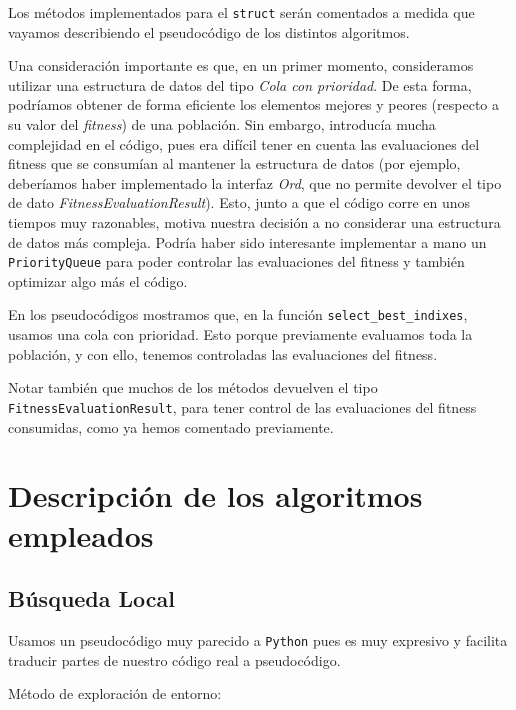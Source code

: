 \documentclass[11pt]{article}
\begin{document}
Los métodos implementados para el \lstinline{struct} serán comentados a medida que vayamos describiendo el pseudocódigo de los distintos algoritmos.

Una consideración importante es que, en un primer momento, consideramos utilizar una estructura de datos del tipo \emph{Cola con prioridad}. De esta forma, podríamos obtener de forma eficiente los elementos mejores y peores (respecto a su valor del \emph{fitness}) de una población. Sin embargo, introducía mucha complejidad en el código, pues era difícil tener en cuenta las evaluaciones del fitness que se consumían al mantener la estructura de datos (por ejemplo, deberíamos haber implementado la interfaz \emph{Ord}, que no permite devolver el tipo de dato \emph{FitnessEvaluationResult}). Esto, junto a que el código corre en unos tiempos muy razonables, motiva nuestra decisión a no considerar una estructura de datos más compleja. Podría haber sido interesante implementar a mano un \lstinline{PriorityQueue} para poder controlar las evaluaciones del fitness y también optimizar algo más el código.

En los pseudocódigos mostramos que, en la función \lstinline{select_best_indixes}, usamos una cola con prioridad. Esto porque previamente evaluamos toda la población, y con ello, tenemos controladas las evaluaciones del fitness.

Notar también que muchos de los métodos devuelven el tipo \lstinline{FitnessEvaluationResult}, para tener control de las evaluaciones del fitness consumidas, como ya hemos comentado previamente.

\pagebreak

\section{Descripción de los algoritmos empleados}

\subsection{Búsqueda Local}

Usamos un pseudocódigo muy parecido a \lstinline{Python} pues es muy expresivo y facilita traducir partes de nuestro código real a pseudocódigo.

Método de exploración de entorno:
\end{document}
